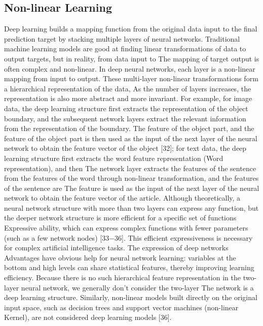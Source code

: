 \documentclass[11pt,en]{elegantpaper}
\begin{document}
\subsection{Non-linear Learning}
Deep learning builds a mapping function from the original data input to the final prediction target by stacking multiple layers of neural networks. Traditional machine learning models are good at finding linear transformations of data to output targets, but in reality, from data input to The mapping of target output is often complex and non-linear. In deep neural networks, each layer is a non-linear mapping from input to output. These multi-layer non-linear transformations form a hierarchical representation of the data, As the number of layers increases, the representation is also more abstract and more invariant. For example, for image data, the deep learning structure first extracts the representation of the object boundary, and the subsequent network layers extract the relevant information from the representation of the boundary. The feature of the object part, and the feature of the object part is then used as the input of the next layer of the neural network to obtain the feature vector of the object [32]; for text data, the deep learning structure first extracts the word feature representation (Word representation), and then The network layer extracts the features of the sentence from the features of the word through non-linear transformation, and the features of the sentence are The feature is used as the input of the next layer of the neural network to obtain the feature vector of the article. Although theoretically, a neural network structure with more than two layers can express any function, but the deeper network structure is more efficient for a specific set of functions Expressive ability, which can express complex functions with fewer parameters (such as a few network nodes) [33−36]. This efficient expressiveness is necessary for complex artificial intelligence tasks. The expression of deep networks Advantages have obvious help for neural network learning: variables at the bottom and high levels can share statistical features, thereby improving learning efficiency. Because there is no such hierarchical feature representation in the two-layer neural network, we generally don't consider the two-layer The network is a deep learning structure. Similarly, non-linear models built directly on the original input space, such as decision trees and support vector machines (non-linear Kernel), are not considered deep learning models [36].
\end{document}
